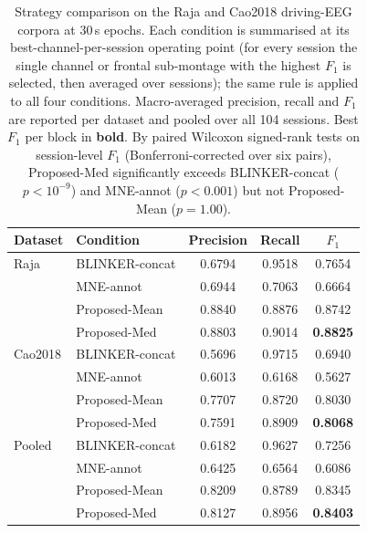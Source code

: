 \begin{table}[ht]
  \centering
  \caption{Strategy comparison on the Raja and Cao2018 driving-EEG corpora at 30\,s epochs. Each condition is summarised at its best-channel-per-session operating point (for every session the single channel or frontal sub-montage with the highest $F_1$ is selected, then averaged over sessions); the same rule is applied to all four conditions. Macro-averaged precision, recall and $F_1$ are reported per dataset and pooled over all 104 sessions. Best $F_1$ per block in \textbf{bold}. By paired Wilcoxon signed-rank tests on session-level $F_1$ (Bonferroni-corrected over six pairs), Proposed-Med significantly exceeds BLINKER-concat ($p<10^{-9}$) and MNE-annot ($p<0.001$) but not Proposed-Mean ($p=1.00$).}
  \label{tab:exp1_main}
  \begin{tabular}{llccc}
    \toprule
    Dataset & Condition & Precision & Recall & $F_1$ \\
    \midrule
    Raja & BLINKER-concat & 0.6794 & 0.9518 & 0.7654 \\
     & MNE-annot & 0.6944 & 0.7063 & 0.6664 \\
     & Proposed-Mean & 0.8840 & 0.8876 & 0.8742 \\
     & Proposed-Med & 0.8803 & 0.9014 & \textbf{0.8825} \\
    \midrule
    Cao2018 & BLINKER-concat & 0.5696 & 0.9715 & 0.6940 \\
     & MNE-annot & 0.6013 & 0.6168 & 0.5627 \\
     & Proposed-Mean & 0.7707 & 0.8720 & 0.8030 \\
     & Proposed-Med & 0.7591 & 0.8909 & \textbf{0.8068} \\
    \midrule
    Pooled & BLINKER-concat & 0.6182 & 0.9627 & 0.7256 \\
     & MNE-annot & 0.6425 & 0.6564 & 0.6086 \\
     & Proposed-Mean & 0.8209 & 0.8789 & 0.8345 \\
     & Proposed-Med & 0.8127 & 0.8956 & \textbf{0.8403} \\
    \bottomrule
  \end{tabular}
\end{table}
